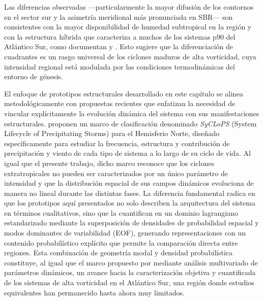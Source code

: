Las diferencias observadas —particularmente la mayor difusión de los contornos en el sector sur y la asimetría meridional más pronunciada en SBR— son consistentes con la mayor disponibilidad de humedad subtropical en la región y con la estructura híbrida que caracteriza a muchos de los sistemas p90 del Atlántico Sur, como documentan \citet{evans2012climatology} y \citet{gozzo2014subtropical}. Esto sugiere que la diferenciación de cuadrantes es un rasgo universal de los ciclones maduros de alta vorticidad, cuya intensidad regional está modulada por las condiciones termodinámicas del entorno de génesis.


El enfoque de prototipos estructurales desarrollado en este capítulo se alinea metodológicamente con propuestas recientes que enfatizan la necesidad de vincular explícitamente la evolución dinámica del sistema con sus manifestaciones estructurales. \citet{han2025system} proponen un marco de clasificación denominado \textit{SyCLoPS} (System Lifecycle of Precipitating Storms) para el Hemisferio Norte, diseñado específicamente para estudiar la frecuencia, estructura y contribución de precipitación y viento de cada tipo de sistema a lo largo de su ciclo de vida. Al igual que el presente trabajo, dicho marco reconoce que los ciclones extratropicales no pueden ser caracterizados por un único parámetro de intensidad y que la distribución espacial de sus campos dinámicos evoluciona de manera no lineal durante las distintas fases. La diferencia fundamental radica en que los prototipos aquí presentados no solo describen la arquitectura del sistema en términos cualitativos, sino que la cuantifican en un dominio lagrangiano estandarizado mediante la superposición de densidades de probabilidad espacial y modos dominantes de variabilidad (EOF), generando representaciones con un contenido probabilístico explícito que permite la comparación directa entre regiones. Esta combinación de geometría modal y densidad probabilística constituye, al igual que el marco propuesto por \citet{corner2025classification} mediante análisis multivariado de parámetros dinámicos, un avance hacia la caracterización objetiva y cuantificada de los sistemas de alta vorticidad en el Atlántico Sur, una región donde estudios equivalentes han permanecido hasta ahora muy limitados.


